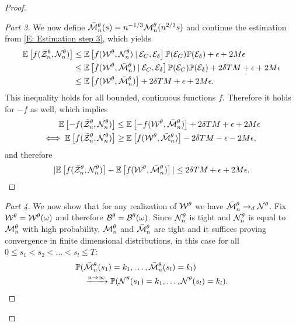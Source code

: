 \begin{proof}
\begin{proof}[Part 3]
We now define $\bar{\mathcal{M}}_n^{\theta}(s) = n^{-1 / 3} \mathcal{M}_n^{\theta}(n^{2 / 3}s)$ and continue the estimation from \eqref{E: Estimation step 3},
which yields
\begin{equation} \label{E: Estimation step 4}
\begin{aligned}
\mathbb{E} \left[ f(\bar{\mathcal{Z}}^{\theta}_n, \mathcal{N}_n^{\theta}) \right] 
&\leq \mathbb{E} \left[ f(\mathcal{W}^{\theta}, \mathcal{N}_n^{\theta}) \: | \: \mathcal{E}_{C}, \mathcal{E}_{\delta} \right] \mathbb{P}(\mathcal{E}_{C}) \mathbb{P}(\mathcal{E}_{\delta}) + \epsilon + 2M\epsilon   \\
&\leq \mathbb{E} \left[ f(\mathcal{W}^{\theta}, \bar{\mathcal{M}}_n^{\theta}) \: | \: \mathcal{E}_{C}, \mathcal{E}_{\delta} \right] \mathbb{P}(\mathcal{E}_{C}) \mathbb{P}(\mathcal{E}_{\delta}) + 2\delta T M + \epsilon  + 2M\epsilon \\
&\leq \mathbb{E} \left[ f(\mathcal{W}^{\theta}, \bar{\mathcal{M}}_n^{\theta}) \right] + 2\delta T M + \epsilon  + 2M\epsilon.
\end{aligned}
\end{equation}
This inequality holds for all bounded, continuous functions $f$. 
Therefore it holds for $-f$ as well, which implies
\begin{equation}
\begin{aligned}
\mathbb{E} \left[ -f(\bar{\mathcal{Z}}^{\theta}_n, \mathcal{N}_n^{\theta}) \right] &\leq \mathbb{E} \left[ -f(\mathcal{W}^{\theta}, \bar{\mathcal{M}}_n^{\theta})  \right]+ 2\delta T M  + \epsilon + 2M\epsilon \\
\iff  \mathbb{E} \left[ f(\bar{\mathcal{Z}}^{\theta}_n, \mathcal{N}_n^{\theta}) \right] &\geq \mathbb{E} \left[ f(\mathcal{W}^{\theta}, \bar{\mathcal{M}}_n^{\theta})  \right] - 2\delta T M  - \epsilon - 2M\epsilon,
\end{aligned}
\end{equation}
and therefore
\begin{equation} \label{E: Equality of Expectations}
	|\mathbb{E} \left[ f(\bar{\mathcal{Z}}^{\theta}_n, \mathcal{N}_n^{\theta}) \right] - \mathbb{E} \left[ f(\mathcal{W}^{\theta}, \bar{\mathcal{M}}_n^{\theta}) \right] | \leq 2\delta T M + \epsilon  + 2M\epsilon.
\end{equation}
\end{proof}

\begin{proof}[Part 4]\renewcommand{\qedsymbol}{}
We now show that for any realization of $\mathcal{W}^{\theta}$ we have $\bar{\mathcal{M}}_n^{\theta} \rightarrow_d \mathcal{N}^{\theta}$.
Fix $\mathcal{W}^{\theta} = \mathcal{W}^{\theta}(\omega)$ and therefore $\mathcal{B}^{\theta} = \mathcal{B}^{\theta}(\omega)$.
Since $\mathcal{N}_n^{\theta}$ is tight and $\mathcal{N}_n^{\theta}$ is equal to $\mathcal{M}_n^{\theta}$ with high probability,
$\mathcal{M}_n^{\theta}$ and $\bar{\mathcal{M}}_n^{\theta}$ are tight and it suffices proving convergence in finite dimensional distributions,
in this case for all $0 \leq s_1 < s_2 < \dots < s_l \leq T$:
\begin{equation} \label{E: convergence fdd}
\begin{aligned}
&\mathbb{P}( \bar{\mathcal{M}}_n^{\theta}(s_1) = k_1, \dots, \bar{\mathcal{M}}_n^{\theta}(s_l) = k_l ) \\
&\quad \xrightarrow{n \rightarrow \infty}  \mathbb{P}( \mathcal{N}^{\theta}(s_1) = k_1, \dots, \mathcal{N}^{\theta}(s_l) = k_l ).
\end{aligned}
\end{equation}


\end{proof}
\end{proof}
